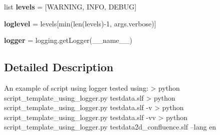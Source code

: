 \begin{DoxyCompactItemize}
\item 
list {\bfseries levels} = \mbox{[}\textquotesingle{}W\+A\+R\+N\+I\+NG\textquotesingle{}, \textquotesingle{}I\+N\+FO\textquotesingle{}, \textquotesingle{}D\+E\+B\+UG\textquotesingle{}\mbox{]}\hypertarget{namespacescript__template__using__logger_a3e8d7fe72f09cd7a538c0809f9ccf7dd}{}\label{namespacescript__template__using__logger_a3e8d7fe72f09cd7a538c0809f9ccf7dd}

\item 
{\bfseries loglevel} = levels\mbox{[}min(len(levels)-\/1, args.\+verbose)\mbox{]}\hypertarget{namespacescript__template__using__logger_a54c1d4d56afac4b3f8addd93d046da66}{}\label{namespacescript__template__using__logger_a54c1d4d56afac4b3f8addd93d046da66}

\item 
{\bfseries logger} = logging.\+get\+Logger(\+\_\+\+\_\+name\+\_\+\+\_\+)\hypertarget{namespacescript__template__using__logger_af4147b656dd8a12cba543669080dc206}{}\label{namespacescript__template__using__logger_af4147b656dd8a12cba543669080dc206}

\end{DoxyCompactItemize}


\subsection{Detailed Description}
\begin{DoxyVerb}An example of script using logger
tested using:
> python script_template_using_logger.py testdata\test.slf
> python script_template_using_logger.py testdata\test.slf -v
> python script_template_using_logger.py testdata\test.slf -vv
> python script_template_using_logger.py testdata\f2d_confluence.slf --lang en
\end{DoxyVerb}
 